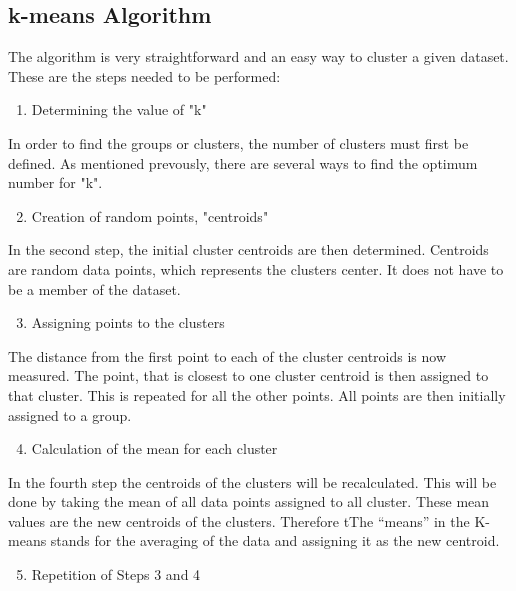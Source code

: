 \documentclass[conference]{IEEEtran}
\begin{document}
\subsection{ k-means Algorithm}
The algorithm is very straightforward and an easy way to cluster a given dataset. These are the steps needed to be performed:

\begin{enumerate}
\setcounter{enumi}{0}
\item Determining the value of "k"
\end{enumerate}

In order to find the groups or clusters, the number of clusters must first be defined. As mentioned prevously, there are several ways to find the optimum number for "k".

\begin{enumerate}
\setcounter{enumi}{1}
\item Creation of random points, "centroids"
\end{enumerate}

In the second step, the initial cluster centroids are then determined. Centroids are random data points, which represents the clusters center. It does not have to be a member of the dataset.

\begin{enumerate}
\setcounter{enumi}{2}
\item Assigning points to the clusters
\end{enumerate}

The distance from the first point to each of the cluster centroids is now measured. The point, that is closest to one cluster centroid is then assigned to that cluster. This is repeated for all the other points. All points are then initially assigned to a group.

\begin{enumerate}
\setcounter{enumi}{3}
\item Calculation of the mean for each cluster
\end{enumerate}

In the fourth step the centroids of the clusters will be recalculated. This will be done by taking the mean of all data points assigned to all cluster. These mean values are the new centroids of the clusters. Therefore tThe “means” in the K-means stands for the averaging of  the data and assigning it as the new centroid.

\begin{enumerate}
\setcounter{enumi}{4}
\item Repetition of Steps 3 and 4
\end{enumerate}
\end{document}
